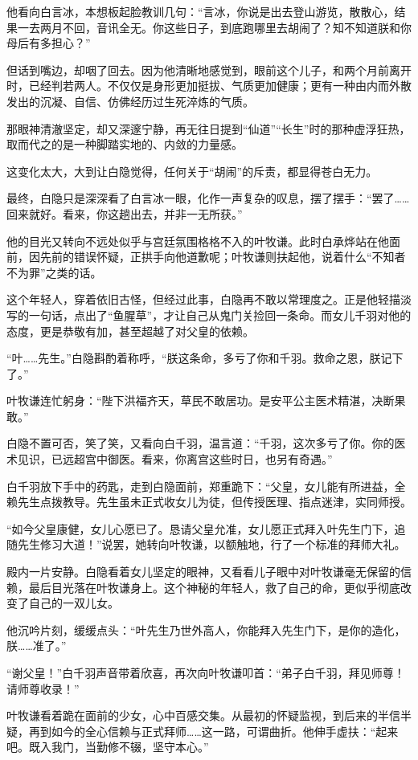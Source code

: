 他看向白言冰，本想板起脸教训几句：“言冰，你说是出去登山游览，散散心，结果一去两月不回，音讯全无。你这些日子，到底跑哪里去胡闹了？知不知道朕和你母后有多担心？”

但话到嘴边，却咽了回去。因为他清晰地感觉到，眼前这个儿子，和两个月前离开时，已经判若两人。不仅仅是身形更加挺拔、气质更加健康；更有一种由内而外散发出的沉凝、自信、仿佛经历过生死淬炼的气质。

那眼神清澈坚定，却又深邃宁静，再无往日提到“仙道”“长生”时的那种虚浮狂热，取而代之的是一种脚踏实地的、内敛的力量感。

这变化太大，大到让白隐觉得，任何关于“胡闹”的斥责，都显得苍白无力。

最终，白隐只是深深看了白言冰一眼，化作一声复杂的叹息，摆了摆手：“罢了……回来就好。看来，你这趟出去，并非一无所获。”

他的目光又转向不远处似乎与宫廷氛围格格不入的叶牧谦。此时白承烨站在他面前，因先前的错误怀疑，正拱手向他道歉呢；叶牧谦则扶起他，说着什么“不知者不为罪”之类的话。

这个年轻人，穿着依旧古怪，但经过此事，白隐再不敢以常理度之。正是他轻描淡写的一句话，点出了“鱼腥草”，才让自己从鬼门关捡回一条命。而女儿千羽对他的态度，更是恭敬有加，甚至超越了对父皇的依赖。

“叶……先生。”白隐斟酌着称呼，“朕这条命，多亏了你和千羽。救命之恩，朕记下了。”

叶牧谦连忙躬身：“陛下洪福齐天，草民不敢居功。是安平公主医术精湛，决断果敢。”

白隐不置可否，笑了笑，又看向白千羽，温言道：“千羽，这次多亏了你。你的医术见识，已远超宫中御医。看来，你离宫这些时日，也另有奇遇。”

白千羽放下手中的药匙，走到白隐面前，郑重跪下：“父皇，女儿能有所进益，全赖先生点拨教导。先生虽未正式收女儿为徒，但传授医理、指点迷津，实同师授。

“如今父皇康健，女儿心愿已了。恳请父皇允准，女儿愿正式拜入叶先生门下，追随先生修习大道！”说罢，她转向叶牧谦，以额触地，行了一个标准的拜师大礼。

殿内一片安静。白隐看着女儿坚定的眼神，又看看儿子眼中对叶牧谦毫无保留的信赖，最后目光落在叶牧谦身上。这个神秘的年轻人，救了自己的命，更似乎彻底改变了自己的一双儿女。

他沉吟片刻，缓缓点头：“叶先生乃世外高人，你能拜入先生门下，是你的造化，朕……准了。”

“谢父皇！”白千羽声音带着欣喜，再次向叶牧谦叩首：“弟子白千羽，拜见师尊！请师尊收录！”

叶牧谦看着跪在面前的少女，心中百感交集。从最初的怀疑监视，到后来的半信半疑，再到如今的全心信赖与正式拜师……这一路，可谓曲折。他伸手虚扶：“起来吧。既入我门，当勤修不辍，坚守本心。”

